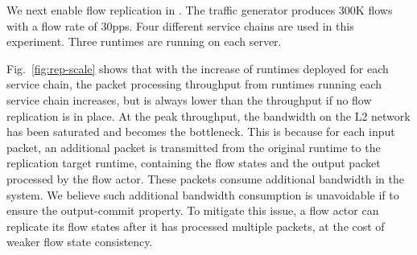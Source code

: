


We next enable flow replication in \nfactor. The traffic generator produces 300K flows with a flow rate of 30pps.  %
Four different service chains are used in this experiment.
Three runtimes are running on each server.

Fig.~\ref{fig:rep-scale} shows that with the increase of runtimes deployed for each service chain, the packet processing throughput from runtimes running each service chain increases, but is always lower than the throughput if no flow replication is in place. %
At the peak throughput, the bandwidth on the L2 network has been saturated and becomes the bottleneck. This is because for each input packet, an additional packet is transmitted from the original runtime to the replication target runtime, %
 containing the flow states and the output packet processed by the flow actor. These packets consume additional bandwidth in the system. %
 We believe such additional bandwidth consumption is unavoidable if to ensure the %
 output-commit property. To mitigate this issue, a flow actor can replicate its flow states after it has processed multiple packets, at the cost of weaker flow state consistency. %

